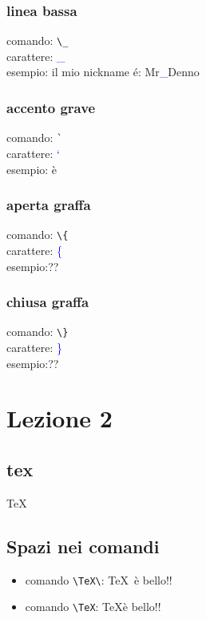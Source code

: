 \documentclass{article}
\begin{document}
        \subsection{linea bassa}
            comando: \verb!\_! \\
            carattere: \textcolor{blue}{\_} \\
            esempio: il mio nickname \'e: Mr\textcolor{blue}{\_}Denno
        \subsection{accento grave}
            comando: \verb!`! \\
            carattere: \textcolor{blue}{`} \\
            esempio: \`{e}
        \subsection{aperta graffa}
            comando: \verb!\{! \\
            carattere: \textcolor{blue}{\{} \\
            esempio:??
        \subsection{chiusa graffa}
            comando: \verb!\}! \\    
            carattere: \textcolor{blue}{\}} \\
            esempio:??
        


    \chapter{Lezione 2}

        \section{tex}
            \TeX\

        \section{Spazi nei comandi}
            \begin{itemize}
                \item comando \verb!\TeX\!: \TeX\ è bello!! %
                \item comando \verb!\TeX!: \TeX è bello!! %
            \end{itemize}
        
\end{document}
